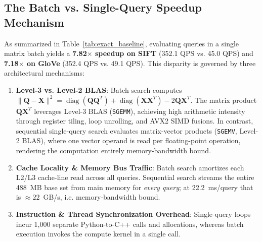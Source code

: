 \documentclass[10pt,twocolumn,a4paper]{article}
\begin{document}
\begin{table}[t]
\centering
\small
\caption{Exact Search Baseline (\texttt{IndexFlatL2}) Performance}
\label{tab:exact_baseline}
\end{table}

\subsection{The Batch vs. Single-Query Speedup Mechanism}
As summarized in Table~\ref{tab:exact_baseline}, evaluating queries in a single matrix batch yields a \textbf{7.82$\times$ speedup on SIFT} (352.1 QPS vs. 45.0 QPS) and \textbf{7.18$\times$ on GloVe} (352.4 QPS vs. 49.1 QPS). This disparity is governed by three architectural mechanisms:
\begin{enumerate}
    \item \textbf{Level-3 vs. Level-2 BLAS}: Batch search computes $\|\mathbf{Q} - \mathbf{X}\|^2 = \operatorname{diag}(\mathbf{Q}\mathbf{Q}^T) + \operatorname{diag}(\mathbf{X}\mathbf{X}^T) - 2\mathbf{Q}\mathbf{X}^T$. The matrix product $\mathbf{Q}\mathbf{X}^T$ leverages Level-3 BLAS (\texttt{SGEMM}), achieving high arithmetic intensity through register tiling, loop unrolling, and AVX2 SIMD fusions. In contrast, sequential single-query search evaluates matrix-vector products (\texttt{SGEMV}, Level-2 BLAS), where one vector operand is read per floating-point operation, rendering the computation entirely memory-bandwidth bound.
    \item \textbf{Cache Locality \& Memory Bus Traffic}: Batch search amortizes each L2/L3 cache-line read across all queries. Sequential search streams the entire 488~MB base set from main memory for \textit{every query}; at 22.2~ms/query that is $\approx 22$~GB/s, i.e. memory-bandwidth bound.
    \item \textbf{Instruction \& Thread Synchronization Overhead}: Single-query loops incur 1,000 separate Python-to-C++ calls and allocations, whereas batch execution invokes the compute kernel in a single call.
\end{enumerate}
\end{document}
